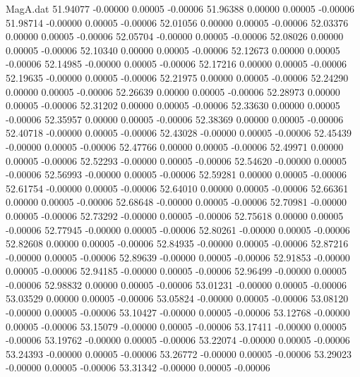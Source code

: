 \begin{filecontents}{MagA.dat}
  51.94077   -0.00000    0.00005   -0.00006
  51.96388    0.00000    0.00005   -0.00006
  51.98714   -0.00000    0.00005   -0.00006
  52.01056    0.00000    0.00005   -0.00006
  52.03376    0.00000    0.00005   -0.00006
  52.05704   -0.00000    0.00005   -0.00006
  52.08026    0.00000    0.00005   -0.00006
  52.10340    0.00000    0.00005   -0.00006
  52.12673    0.00000    0.00005   -0.00006
  52.14985   -0.00000    0.00005   -0.00006
  52.17216    0.00000    0.00005   -0.00006
  52.19635   -0.00000    0.00005   -0.00006
  52.21975    0.00000    0.00005   -0.00006
  52.24290    0.00000    0.00005   -0.00006
  52.26639    0.00000    0.00005   -0.00006
  52.28973    0.00000    0.00005   -0.00006
  52.31202    0.00000    0.00005   -0.00006
  52.33630    0.00000    0.00005   -0.00006
  52.35957    0.00000    0.00005   -0.00006
  52.38369    0.00000    0.00005   -0.00006
  52.40718   -0.00000    0.00005   -0.00006
  52.43028   -0.00000    0.00005   -0.00006
  52.45439   -0.00000    0.00005   -0.00006
  52.47766    0.00000    0.00005   -0.00006
  52.49971    0.00000    0.00005   -0.00006
  52.52293   -0.00000    0.00005   -0.00006
  52.54620   -0.00000    0.00005   -0.00006
  52.56993   -0.00000    0.00005   -0.00006
  52.59281    0.00000    0.00005   -0.00006
  52.61754   -0.00000    0.00005   -0.00006
  52.64010    0.00000    0.00005   -0.00006
  52.66361    0.00000    0.00005   -0.00006
  52.68648   -0.00000    0.00005   -0.00006
  52.70981   -0.00000    0.00005   -0.00006
  52.73292   -0.00000    0.00005   -0.00006
  52.75618    0.00000    0.00005   -0.00006
  52.77945   -0.00000    0.00005   -0.00006
  52.80261   -0.00000    0.00005   -0.00006
  52.82608    0.00000    0.00005   -0.00006
  52.84935   -0.00000    0.00005   -0.00006
  52.87216   -0.00000    0.00005   -0.00006
  52.89639   -0.00000    0.00005   -0.00006
  52.91853   -0.00000    0.00005   -0.00006
  52.94185   -0.00000    0.00005   -0.00006
  52.96499   -0.00000    0.00005   -0.00006
  52.98832    0.00000    0.00005   -0.00006
  53.01231   -0.00000    0.00005   -0.00006
  53.03529    0.00000    0.00005   -0.00006
  53.05824   -0.00000    0.00005   -0.00006
  53.08120   -0.00000    0.00005   -0.00006
  53.10427   -0.00000    0.00005   -0.00006
  53.12768   -0.00000    0.00005   -0.00006
  53.15079   -0.00000    0.00005   -0.00006
  53.17411   -0.00000    0.00005   -0.00006
  53.19762   -0.00000    0.00005   -0.00006
  53.22074   -0.00000    0.00005   -0.00006
  53.24393   -0.00000    0.00005   -0.00006
  53.26772   -0.00000    0.00005   -0.00006
  53.29023   -0.00000    0.00005   -0.00006
  53.31342   -0.00000    0.00005   -0.00006

\end{filecontents}
